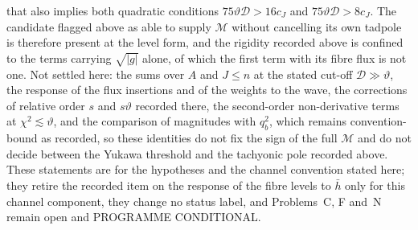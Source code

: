 that also implies both quadratic conditions \(75\vartheta\mathcal D>16c_J\) and \(75\vartheta\mathcal D>8c_J\). The candidate flagged above as able to supply \(\mathcal M\) without cancelling its own tadpole is therefore present at the level form, and the rigidity recorded above is confined to the terms carrying \(\sqrt{|g|}\) alone, of which the first term with its fibre flux is not one. Not settled here: the sums over \(A\) and \(J\le n\) at the stated cut-off \(\mathcal D\gg\vartheta\), the response of the flux insertions and of the weights to the wave, the corrections of relative order \(s\) and \(s\vartheta\) recorded there, the second-order non-derivative terms at \(\chi^2\lesssim\vartheta\), and the comparison of magnitudes with \(q_b^2\), which remains convention-bound as recorded, so these identities do not fix the sign of the full \(\mathcal M\) and do not decide between the Yukawa threshold and the tachyonic pole recorded above. These statements are for the hypotheses and the channel convention stated here; they retire the recorded item on the response of the fibre levels to \(\bar h\) only for this channel component, they change no status label, and Problems~C, F and~N remain open and PROGRAMME CONDITIONAL.

